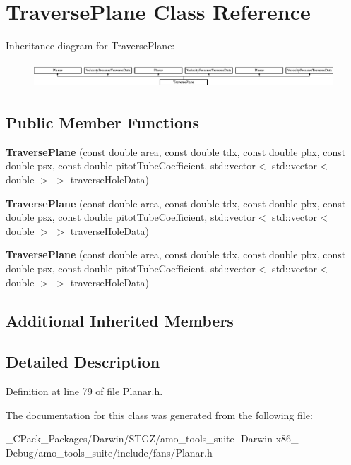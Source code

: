 \hypertarget{class_traverse_plane}{}\section{Traverse\+Plane Class Reference}
\label{class_traverse_plane}
Inheritance diagram for Traverse\+Plane\+:\begin{figure}[H]
\begin{center}
\leavevmode
\includegraphics[height=0.962199cm]{dc/d2a/class_traverse_plane}
\end{center}
\end{figure}
\subsection*{Public Member Functions}
\begin{DoxyCompactItemize}
\item 
\mbox{\label{class_traverse_plane_abbe5d384cc7fbd35c19c4f840247769f}} 
{\bfseries Traverse\+Plane} (const double area, const double tdx, const double pbx, const double psx, const double pitot\+Tube\+Coefficient, std\+::vector$<$ std\+::vector$<$ double $>$ $>$ traverse\+Hole\+Data)
\item 
\mbox{\label{class_traverse_plane_abbe5d384cc7fbd35c19c4f840247769f}} 
{\bfseries Traverse\+Plane} (const double area, const double tdx, const double pbx, const double psx, const double pitot\+Tube\+Coefficient, std\+::vector$<$ std\+::vector$<$ double $>$ $>$ traverse\+Hole\+Data)
\item 
\mbox{\label{class_traverse_plane_abbe5d384cc7fbd35c19c4f840247769f}} 
{\bfseries Traverse\+Plane} (const double area, const double tdx, const double pbx, const double psx, const double pitot\+Tube\+Coefficient, std\+::vector$<$ std\+::vector$<$ double $>$ $>$ traverse\+Hole\+Data)
\end{DoxyCompactItemize}
\subsection*{Additional Inherited Members}


\subsection{Detailed Description}


Definition at line 79 of file Planar.\+h.



The documentation for this class was generated from the following file\+:\begin{DoxyCompactItemize}
\item 
\+\_\+\+C\+Pack\+\_\+\+Packages/\+Darwin/\+S\+T\+G\+Z/amo\+\_\+tools\+\_\+suite-\/-\/\+Darwin-\/x86\+\_-\/\+Debug/amo\+\_\+tools\+\_\+suite/include/fans/Planar.\+h\end{DoxyCompactItemize}
